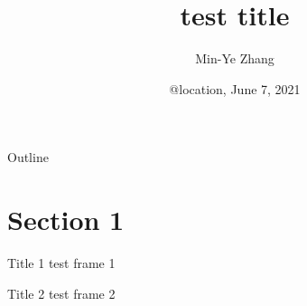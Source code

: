 \documentclass[presentation]{beamer}
\author[MY Zhang]{Min-Ye Zhang}
\date[June 7, 2021]{@location, June 7, 2021}
\title[test]{test title}
\begin{document}
\begin{frame}
\titlepage
\end{frame}

\begin{frame}{Outline}
  \tableofcontents
\end{frame}

\section{Section 1}
\begin{frame}{Title 1}{}
test frame 1
\end{frame}

\begin{frame}{Title 2}{}
test frame 2
\end{frame}
\end{document}
